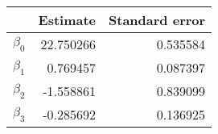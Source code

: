 \begin{tabular}{lrr}
\toprule
{} &   Estimate &  Standard error \\
\midrule
$\beta_0$ &  22.750266 &        0.535584 \\
$\beta_1$ &   0.769457 &        0.087397 \\
$\beta_2$ &  -1.558861 &        0.839099 \\
$\beta_3$ &  -0.285692 &        0.136925 \\
\bottomrule
\end{tabular}
